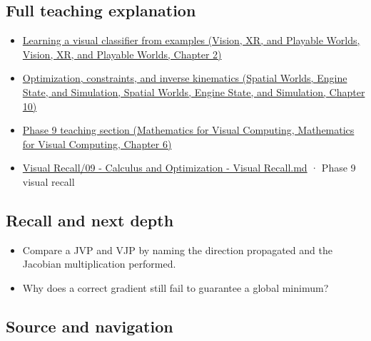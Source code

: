 \subsection{Full teaching explanation}\label{appendix-40df0855b4a7-full-teaching-explanation}

\begin{itemize}
\tightlist
\item
  \href{../07-Vision-XR-and-Playable-Worlds/main.pdf\#nameddest=04-visual-computing-ii-ch031-learning-a-visual-classifier-from-examples}{Learning a visual classifier from examples (Vision, XR, and Playable Worlds, Vision, XR, and Playable Worlds, Chapter 2)}
\item
  \href{../05-Spatial-Worlds-Engine-State-and-Simulation/main.pdf\#nameddest=04-visual-computing-ii-ch029-optimization-constraints-and-inverse-kinematics}{Optimization, constraints, and inverse kinematics (Spatial Worlds, Engine State, and Simulation, Spatial Worlds, Engine State, and Simulation, Chapter 10)}
\item
  \href{../02-Mathematics-for-Visual-Computing/main.pdf\#nameddest=02-foundations-ii-ch022-numerical-differentiation-and-automatic-differentiation}{Phase 9 teaching section (Mathematics for Visual Computing, Mathematics for Visual Computing, Chapter 6)}
\item
  \hyperref[appendix-adf48f5dc5c1]{Visual Recall/09 - Calculus and Optimization - Visual Recall.md} · Phase 9 visual recall
\end{itemize}

\subsection{Recall and next depth}\label{appendix-40df0855b4a7-recall-and-next-depth}

\begin{itemize}
\tightlist
\item
  Compare a JVP and VJP by naming the direction propagated and the Jacobian multiplication performed.
\item
  Why does a correct gradient still fail to guarantee a global minimum?
\end{itemize}

\subsection{Source and navigation}\label{appendix-40df0855b4a7-source-and-navigation}

